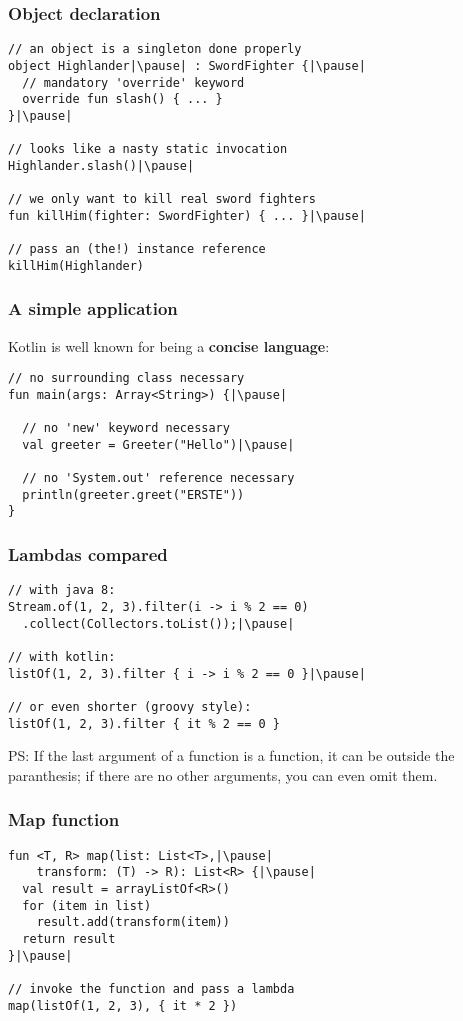 \begin{frame}[fragile] \frametitle{Object declaration}
\pause
\begin{lstlisting}
// an object is a singleton done properly
object Highlander|\pause| : SwordFighter {|\pause|
  // mandatory 'override' keyword
  override fun slash() { ... }
}|\pause|

// looks like a nasty static invocation
Highlander.slash()|\pause|

// we only want to kill real sword fighters
fun killHim(fighter: SwordFighter) { ... }|\pause|

// pass an (the!) instance reference
killHim(Highlander)
\end{lstlisting}
\end{frame}


\begin{frame}[fragile] \frametitle{A simple application}
Kotlin is well known for being a \textbf{concise language}:\pause
\begin{lstlisting}
// no surrounding class necessary
fun main(args: Array<String>) {|\pause|

  // no 'new' keyword necessary
  val greeter = Greeter("Hello")|\pause|

  // no 'System.out' reference necessary
  println(greeter.greet("ERSTE"))
}
\end{lstlisting}
\end{frame}

\begin{frame}[fragile] \frametitle{Lambdas compared}
\pause
\begin{lstlisting}
// with java 8:
Stream.of(1, 2, 3).filter(i -> i % 2 == 0)
  .collect(Collectors.toList());|\pause|

// with kotlin:
listOf(1, 2, 3).filter { i -> i % 2 == 0 }|\pause|

// or even shorter (groovy style):
listOf(1, 2, 3).filter { it % 2 == 0 }
\end{lstlisting}
\pause
\small{PS: If the last argument of a function is a function, it can be outside the paranthesis; if there are no other arguments, you can even omit them.}
\end{frame}

\begin{frame}[fragile] \frametitle{Map function}
\pause
\begin{lstlisting}
fun <T, R> map(list: List<T>,|\pause|
    transform: (T) -> R): List<R> {|\pause|
  val result = arrayListOf<R>()
  for (item in list)
    result.add(transform(item))
  return result
}|\pause|

// invoke the function and pass a lambda
map(listOf(1, 2, 3), { it * 2 })
\end{lstlisting}
\end{frame}

